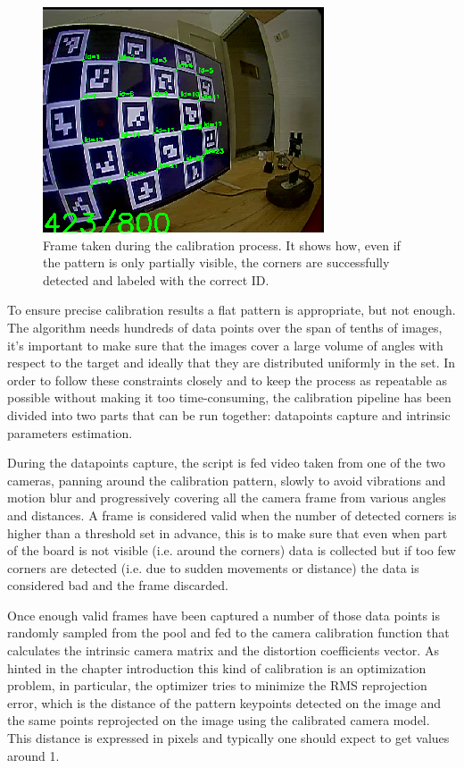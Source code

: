 \begin{figure}[h]
  \centering
  \includegraphics[scale=0.7]{figures/not_all.png}
  \caption{Frame taken during the calibration process. It shows how, even if the pattern is only partially visible, the corners are successfully detected and labeled with the correct ID.}
  \label{img:ch_calib}
\end{figure}

To ensure precise calibration results a flat pattern is appropriate, but not enough. The algorithm needs hundreds of data points over the span of tenths of images, it's important to make sure that the images cover a large volume of angles with respect to the target and ideally that they are distributed uniformly in the set. In order to follow these constraints closely and to keep the process as repeatable as possible without making it too time-consuming, the calibration pipeline has been divided into two parts that can be run together: datapoints capture and intrinsic parameters estimation.

During the datapoints capture, the script is fed video taken from one of the two cameras, panning around the calibration pattern, slowly to avoid vibrations and motion blur and progressively covering all the camera frame from various angles and distances. A frame is considered valid when the number of detected corners is higher than a threshold set in advance, this is to make sure that even when part of the board is not visible (i.e. around the corners) data is collected but if too few corners are detected (i.e. due to sudden movements or distance) the data is considered bad and the frame discarded.

Once enough valid frames have been captured a number of those data points is randomly sampled from the pool and fed to the camera calibration function that calculates the intrinsic camera matrix and the distortion coefficients vector. As hinted in the chapter introduction this kind of calibration is an optimization problem, in particular, the optimizer tries to minimize the RMS reprojection error, which is the distance of the pattern keypoints detected on the image and the same points reprojected on the image using the calibrated camera model. This distance is expressed in pixels and typically one should expect to get values around 1.

